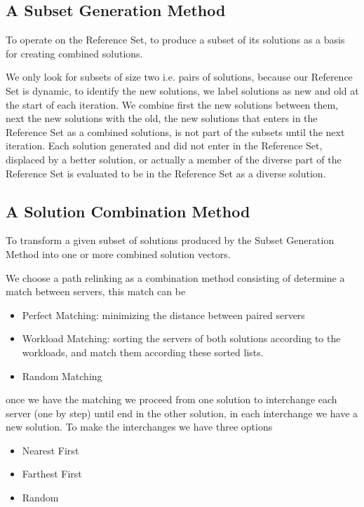 \subsection{A Subset Generation Method}
To operate on the Reference Set,
to produce a subset of its solutions
as a basis for creating combined solutions.

We only look for subsets of size two
i.e. pairs of solutions,
because our Reference Set is dynamic,
to identify the new solutions,
we label solutions as new and old
at the start of each iteration.
We combine first the new solutions
between them,
next the new solutions with the old,
the new solutions that enters in the Reference Set
as a combined solutions,
is not part of the subsets
until the next iteration.
Each solution generated
and did not enter in the Reference Set,
displaced by a better solution,
or actually
a member of the diverse part of the Reference Set
is evaluated to be in the Reference Set
as a diverse solution.

\subsection{A Solution Combination Method}
To transform a given subset of solutions 
produced by the Subset Generation Method
into
one or more combined solution vectors.

We choose a path relinking as a combination method
consisting of
determine a match between servers,
this match can be
\begin{itemize}
\item Perfect Matching:
  minimizing the distance between paired servers
\item Workload Matching:
  sorting the servers of both solutions
  according to the workloads,
  and match them according these sorted lists.
\item Random Matching
\end{itemize}
once we have the matching
we proceed from one solution
to interchange each server
(one by step)
until end in the other solution,
in each interchange
we have a new solution.
To make the interchanges
we have three options
\begin{itemize}
\item Nearest First
\item Farthest First
\item Random
\end{itemize}
